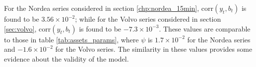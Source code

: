 For the Nordea series considered in section \ref{chp:nordea_15min},
$\text{corr}(y_t, b_t)$ is found to be $3.56 \times 10^{-2}$; while
for the Volvo series considered in section \ref{sec:volvo},
$\text{corr}(y_t, b_t)$ is found to be $-7.3 \times 10^{-3}$. These
values are comparable to those in table \ref{tab:assets_params}, where
$\psi$ is $1.7 \times 10^{-2}$ for the Nordea series and $-1.6
\times 10^{-2}$ for the Volvo series. The similarity in these values
provides some evidence about the validity of the model.

